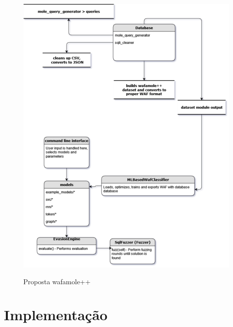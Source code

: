 \begin{figure}[H]
    \centering
    \caption{Proposta wafamole++}
    \includegraphics[width=16cm]{figuras/wafamole_proposal_language_agnostic.png} 
    \label{fig:internet} 
\end{figure}

\section{Implementação}

